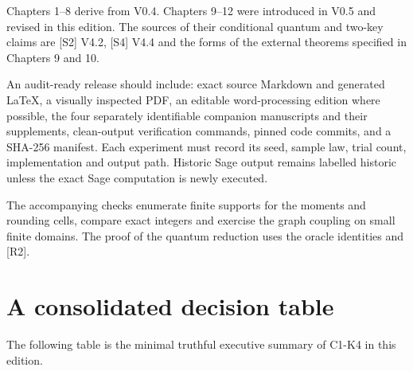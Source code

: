 \documentclass[
  11pt,
  a4paper,
  oneside]{report}
\begin{document}
Chapters 1--8 derive from V0.4. Chapters 9--12 were introduced in V0.5
and revised in this edition. The sources of their conditional quantum
and two-key claims are {[}S2{]} V4.2, {[}S4{]} V4.4 and the forms of the
external theorems specified in Chapters 9 and 10.

An audit-ready release should include: exact source Markdown and
generated LaTeX, a visually inspected PDF, an editable word-processing
edition where possible, the four separately identifiable companion
manuscripts and their supplements, clean-output verification commands,
pinned code commits, and a SHA-256 manifest. Each experiment must record
its seed, sample law, trial count, implementation and output path.
Historic Sage output remains labelled historic unless the exact Sage
computation is newly executed.

The accompanying checks enumerate finite supports for the moments and
rounding cells, compare exact integers and exercise the graph coupling
on small finite domains. The proof of the quantum reduction uses the
oracle identities and {[}R2{]}.

\section{A consolidated decision
table}\label{a-consolidated-decision-table}

The following table is the minimal truthful executive summary of C1-K4
in this edition.
\end{document}
